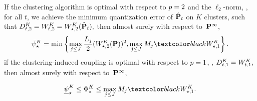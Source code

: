 
\begin{theorem}
\label{cor:opt_cluster}
 If the clustering algorithm is optimal with respect to $p=2$ and the $\ell_2$-norm, \ie, for all $t$, we achieve the minimum quantization error of $\hat{{\mathbf P}}_t$ on $K$ clusters, such that
    $D^K_{t,2} = W^K_{t,2}=W^K_{\star,2}(\hat{{\mathbf P}}_t),$
 then almost surely with respect to~${\mathbf P}^{\infty}$,
\begin{equation*}
    \bar{\psi}_\star^K =  \min \left\{{\max_{j \leq J}\frac{L_j}{2}}(\ld^K_{\star,2}(\prob))^2,\max_{j\leq J}M_j\RC{\ld^K_{\star,1}}\right\}.\end{equation*}
 if the clustering-induced coupling is optimal with respect to $p=1$, \ie,
    $ D^K_{t,1} = W^K_{t,1}, $
   then almost surely with respect to~${\mathbf P}^{\infty}$,
   
\begin{equation*} 
\begin{aligned} 
   {\underline{\psi}_\star^K \leq \Phi^K_\star}\leq
        \max_{j\leq J}M_j\RC{\ld^K_{\star,1}}.
\end{aligned}
\end{equation*}

\end{theorem}
